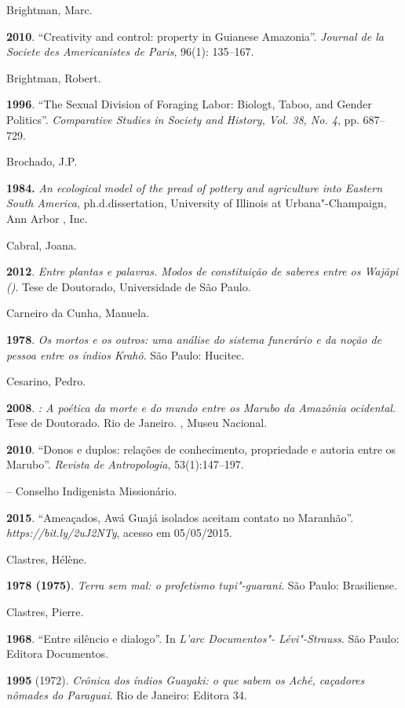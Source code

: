 \begin{Parskip}
Brightman, Marc.

\textbf{2010}. ``Creativity and control: property in Guianese
Amazonia''. \emph{Journal de la Societe des Americanistes de Paris},
96(1): 135--167.

Brightman, Robert.

\textbf{1996}. ``The Sexual Division of Foraging Labor: Biologt, Taboo,
and Gender Politics''. \emph{Comparative Studies in Society and History,
Vol. 38, No. 4}, pp. 687--729.

Brochado, J.P.

\textbf{1984.} \emph{An ecological model of the pread of pottery and
agriculture into Eastern South America}, ph.d.dissertation, University
of Illinois at Urbana"-Champaign, Ann Arbor , Inc.

Cabral, Joana.

\textbf{2012}. \emph{Entre plantas e palavras. Modos de constituição de
saberes entre os Wajãpi ()}. Tese de Doutorado, Universidade de São
Paulo.

Carneiro da Cunha, Manuela.

\textbf{1978}. \emph{Os mortos e os outros: uma análise do sistema
funerário e da noção de pessoa entre os índios Krahô}. São Paulo:
Hucitec.

Cesarino, Pedro.

\textbf{2008}. \emph{: A poética da morte e do mundo entre os
Marubo da Amazônia ocidental}. Tese de Doutorado. Rio de Janeiro. ,
Museu Nacional.

\textbf{2010}. ``Donos e duplos: relações de conhecimento, propriedade
e autoria entre os Marubo''. \emph{Revista de Antropologia},
53(1):147--197.

 -- Conselho Indigenista Missionário.

\textbf{2015}. ``Ameaçados, Awá Guajá isolados aceitam contato no
Maranhão''. \emph{https://bit.ly/2uJ2NTy}, acesso em 05/05/2015.

Clastres, Hélène.

\textbf{1978 (1975)}. \emph{Terra sem mal: o profetismo tupi"-guarani}.
São Paulo: Brasiliense.

Clastres, Pierre.

\textbf{1968}. ``Entre silêncio e dialogo''. In \emph{L'arc Documentos"-
Lévi"-Strauss}. São Paulo: Editora Documentos.

\textbf{1995} (1972). \emph{Crônica dos índios Guayaki: o que sabem os
Aché, caçadores nômades do Paraguai}. Rio de Janeiro: Editora 34.


\end{Parskip}
